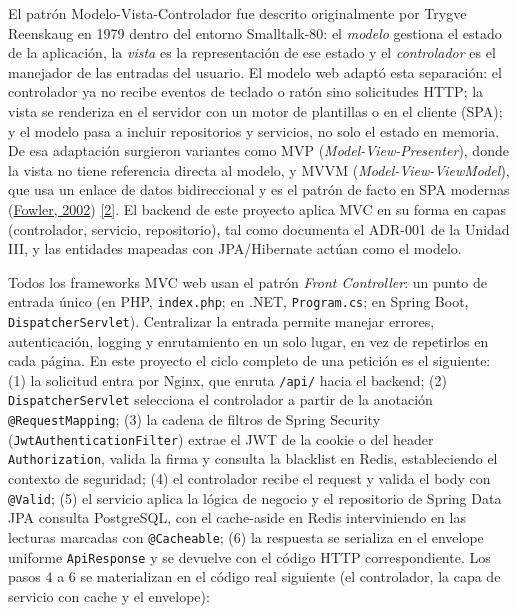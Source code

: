 \documentclass[12pt,a4paper]{article}
\begin{document}
El patrón Modelo-Vista-Controlador fue descrito originalmente por Trygve Reenskaug en
1979 dentro del entorno Smalltalk-80: el \textit{modelo} gestiona el estado de la
aplicación, la \textit{vista} es la representación de ese estado y el \textit{controlador}
es el manejador de las entradas del usuario. El modelo web adaptó esta separación: el
controlador ya no recibe eventos de teclado o ratón sino solicitudes HTTP; la vista se
renderiza en el servidor con un motor de plantillas o en el cliente (SPA); y el modelo
pasa a incluir repositorios y servicios, no solo el estado en memoria. De esa adaptación
surgieron variantes como MVP (\textit{Model-View-Presenter}), donde la vista no tiene
referencia directa al modelo, y MVVM (\textit{Model-View-ViewModel}), que usa un enlace de
datos bidireccional y es el patrón de facto en SPA modernas (\hyperlink{ref:fowler}{Fowler, 2002}) \hyperlink{ieee2}{[2]}. El backend de
este proyecto aplica MVC en su forma en capas (controlador, servicio, repositorio), tal
como documenta el ADR-001 de la Unidad III, y las entidades mapeadas con JPA/Hibernate
actúan como el modelo.

Todos los frameworks MVC web usan el patrón \textit{Front Controller}: un punto de
entrada único (en PHP, \texttt{index.php}; en .NET, \texttt{Program.cs}; en Spring Boot,
\texttt{DispatcherServlet}). Centralizar la entrada permite manejar errores,
autenticación, logging y enrutamiento en un solo lugar, en vez de repetirlos en cada
página. En este proyecto el ciclo completo de una petición es el siguiente: (1) la
solicitud entra por Nginx, que enruta \texttt{/api/} hacia el backend; (2)
\texttt{DispatcherServlet} selecciona el controlador a partir de la anotación
\texttt{@RequestMapping}; (3) la cadena de filtros de Spring Security
(\texttt{JwtAuthenticationFilter}) extrae el JWT de la cookie o del header
\texttt{Authorization}, valida la firma y consulta la blacklist en Redis, estableciendo el
contexto de seguridad; (4) el controlador recibe el request y valida el body con
\texttt{@Valid}; (5) el servicio aplica la lógica de negocio y el repositorio de Spring
Data JPA consulta PostgreSQL, con el cache-aside en Redis interviniendo en las lecturas
marcadas con \texttt{@Cacheable}; (6) la respuesta se serializa en el envelope uniforme
\texttt{ApiResponse} y se devuelve con el código HTTP correspondiente. Los pasos 4 a 6 se
materializan en el código real siguiente (el controlador, la capa de servicio con cache y
el envelope):
\end{document}
